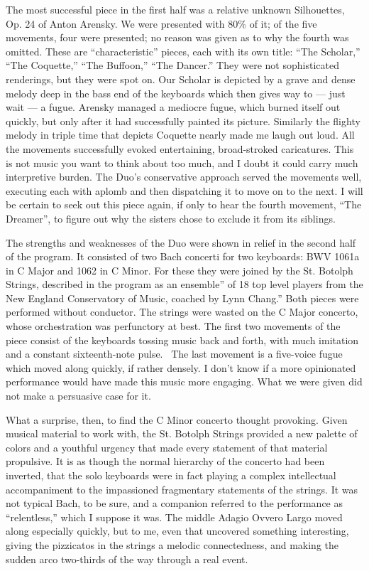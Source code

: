 The most successful piece in the first half was a relative unknown Silhouettes, Op. 24 of Anton Arensky. We were presented with 80\% of it; of the five movements, four were presented; no reason was given as to why the fourth was omitted. These are “characteristic” pieces, each with its own title: “The Scholar,” “The Coquette,” “The Buffoon,” “The Dancer.” They were not sophisticated renderings, but they were spot on. Our Scholar is depicted by a grave and dense melody deep in the bass end of the keyboards which then gives way to — just wait — a fugue. Arensky managed a mediocre fugue, which burned itself out quickly, but only after it had successfully painted its picture. Similarly the flighty melody in triple time that depicts Coquette nearly made me laugh out loud. All the movements successfully evoked entertaining, broad-stroked caricatures. This is not music you want to think about too much, and I doubt it could carry much interpretive burden. The Duo’s conservative approach served the movements well, executing each with aplomb and then dispatching it to move on to the next. I will be certain to seek out this piece again, if only to hear the fourth movement, “The Dreamer”, to figure out why the sisters chose to exclude it from its siblings.

The strengths and weaknesses of the Duo were shown in relief in the second half of the program. It consisted of two Bach concerti for two keyboards: BWV 1061a in C Major and 1062 in C Minor. For these they were joined by the St. Botolph Strings, described in the program as an ensemble” of 18 top level players from the New England Conservatory of Music, coached by Lynn Chang.” Both pieces were performed without conductor. The strings were wasted on the C Major concerto, whose orchestration was perfunctory at best. The first two movements of the piece consist of the keyboards tossing music back and forth, with much imitation and a constant sixteenth-note pulse.  The last movement is a five-voice fugue which moved along quickly, if rather densely. I don't know if a more opinionated performance would have made this music more engaging. What we were given did not make a persuasive case for it.

What a surprise, then, to find the C Minor concerto thought provoking. Given musical material to work with, the St. Botolph Strings provided a new palette of colors and a youthful urgency that made every statement of that material propulsive. It is as though the normal hierarchy of the concerto had been inverted, that the solo keyboards were in fact playing a complex intellectual accompaniment to the impassioned fragmentary statements of the strings. It was not typical Bach, to be sure, and a companion referred to the performance as “relentless,” which I suppose it was. The middle Adagio Ovvero Largo moved along especially quickly, but to me, even that uncovered something interesting, giving the pizzicatos in the strings a melodic connectedness, and making the sudden arco two-thirds of the way through a real event.

